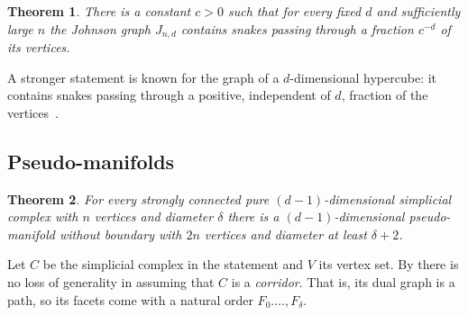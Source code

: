 \documentclass[12pt,a4paper]{article}
\theoremstyle{plain}
\newtheorem{theorem}{Theorem}
\theoremstyle{definition}
\begin{document}
\begin{theorem}
There is a constant $c>0$ such that for every fixed $d$ and sufficiently large $n$ the Johnson graph $J_{n,d}$ contains snakes passing through a fraction $c^{-d}$ of its vertices.
\end{theorem}

A stronger statement is known for the graph of a $d$-dimensional hypercube: it contains snakes passing through a positive, independent of $d$, fraction of the vertices~\cite{AbbottKatchalski}.


\subsection{Pseudo-manifolds}

\begin{theorem}
\label{thm:pseudo_manifolds}
For every strongly connected pure $(d-1)$-dimensional simplicial complex with $n$ vertices and diameter $\delta$ there is a $(d-1)$-dimensional pseudo-manifold without boundary with $2n$ vertices and diameter at least $\delta+2$.
\end{theorem}

Let $C$ be the simplicial complex in the statement and $V$ its vertex set. By \cite[Corollary 2.7]{Santos:progress} there is no loss of generality in assuming that $C$ is a \emph{corridor}. That is, its dual graph is a path, so its facets come with a natural order $F_0.\dots, F_\delta$. 
\end{document}
